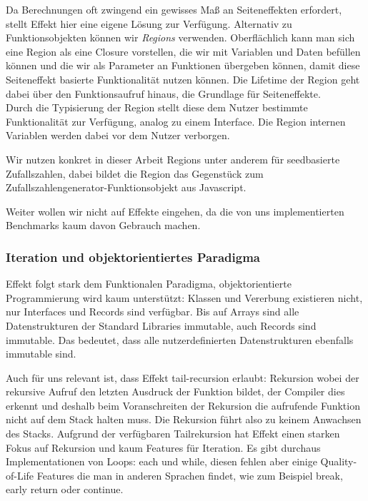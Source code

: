 Da Berechnungen oft zwingend ein gewisses Maß an Seiteneffekten erfordert, stellt Effekt hier eine eigene Lösung zur Verfügung.
Alternativ zu Funktionsobjekten können wir \textit{Regions} verwenden. Oberflächlich kann man sich eine Region als eine Closure vorstellen, die wir mit Variablen und Daten befüllen können und die wir als Parameter an Funktionen übergeben können, damit diese Seiteneffekt basierte Funktionalität nutzen können. Die Lifetime der Region geht dabei über den Funktionsaufruf hinaus, die Grundlage für Seiteneffekte.\\
Durch die Typisierung der Region stellt diese dem Nutzer bestimmte Funktionalität zur Verfügung, analog zu einem Interface. Die Region internen Variablen werden dabei vor dem Nutzer verborgen.

Wir nutzen konkret in dieser Arbeit Regions unter anderem für seedbasierte Zufallszahlen, dabei bildet die Region das Gegenstück zum Zufallszahlengenerator-Funktionsobjekt aus Javascript.

Weiter wollen wir nicht auf Effekte eingehen, da die von uns implementierten Benchmarks kaum davon Gebrauch machen.

\subsubsection{ Iteration und objektorientiertes Paradigma }

Effekt folgt stark dem Funktionalen Paradigma, objektorientierte Programmierung wird kaum unterstützt:
Klassen und Vererbung existieren nicht, nur Interfaces und Records sind verfügbar.
Bis auf Arrays sind alle Datenstrukturen der Standard Libraries immutable, auch Records sind immutable. Das bedeutet, dass alle nutzerdefinierten Datenstrukturen ebenfalls immutable sind.

Auch für uns relevant ist, dass Effekt tail-recursion erlaubt: Rekursion wobei der rekursive Aufruf den letzten Ausdruck der Funktion bildet, der Compiler dies erkennt und deshalb beim Voranschreiten der Rekursion die aufrufende Funktion nicht auf dem Stack halten muss. Die Rekursion führt also zu keinem Anwachsen des Stacks. 
Aufgrund der verfügbaren Tailrekursion hat Effekt einen starken Fokus auf Rekursion und kaum Features für Iteration. Es gibt durchaus Implementationen von Loops: each und while, diesen fehlen aber einige Quality-of-Life Features die man in anderen Sprachen findet, wie zum Beispiel break, early return oder continue.

